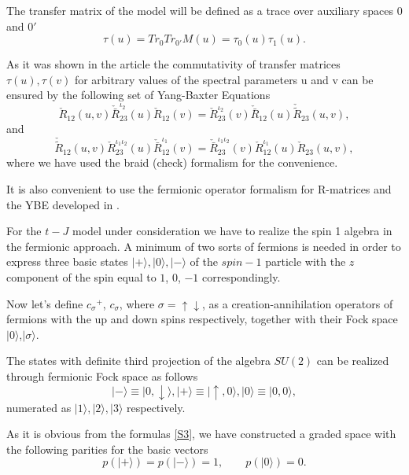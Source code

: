 \documentclass[a4paper,12pt]{article}
\begin{document}
The transfer matrix of the model will be defined as a trace over auxiliary 
spaces $0$ and $0'$ 
\begin{equation} 
\label{T1}
\tau(u)=Tr_0Tr_{0'}M(u)=\tau_0(u)\tau_1(u).
\end{equation}

As it was shown in the article \cite{APSS} the commutativity of 
transfer matrices $\tau(u),\tau(v)$ for arbitrary values of the
spectral parameters u and v can be ensured by the following set of 
Yang-Baxter Equations
\begin{equation}
\label{R3}
\check{R}_{12}(u,v)\check{\bar{R}}_{23}^{\iota_2}(u)\check{R}_{12}(v)=
\check{R}_{23}^{\iota_2}(v)\check{\bar{R}}_{12}(u)\check{\tilde{R}}_{23}(u,v),
\end{equation}
and
\begin{equation}
\label{R4}
\check{\tilde{R}}_{12}(u,v)\check{R}_{23}^{\iota_1\iota_2}(u)
\check{\bar{R}}_{12}^{\iota_1}(v)
=\check{\bar{R}}_{23}^{\iota_1\iota_2}(v)\check{R}_{12}^{\iota_1}(u)
\check{R}_{23}(u,v),
\end{equation}
where we have used the braid (check) formalism for the convenience.

It is also convenient to use the fermionic operator formalism for 
R-matrices and the YBE developed in \cite{HS, AK, GM, US}.

For the $t-J$ model under consideration \cite{AK,U,L,S,KOR,BBO,EK} we 
have to
realize the spin 1 algebra in the fermionic approach. A minimum of two
sorts of fermions is needed in order to express three basic states 
$\mid+\rangle,\mid 0 \rangle,\mid -\rangle$ of the $spin-1$
particle with the $z$ component of the spin equal to $1$, $0$, $-1$ 
correspondingly.

Now let's define ${c_\sigma}^+$, $c_\sigma$, where $\sigma=\uparrow
\downarrow$, as a creation-annihilation operators of fermions with the
 up and down spins respectively, together with their Fock space 
$\mid0\rangle$,$ \mid{\sigma}\rangle$.

The states with definite third projection of the algebra $SU(2)$
can be realized through fermionic Fock space as follows
\begin{equation}
\label{S3}
\mid-\rangle \equiv \mid0 ,\downarrow \rangle, 
\mid+\rangle \equiv \mid \uparrow ,0 \rangle,
\mid0\rangle \equiv \mid0 ,0\rangle,
\end{equation}
numerated as $\mid 1 \rangle,\mid 2 \rangle,\mid 3 \rangle$ respectively.

As it is obvious from the formulas \ref{S3}, we have constructed a
graded space with the following parities for the basic vectors
\begin{equation}
\label{S4}
p(\mid+\rangle)=p(\mid -\rangle)=1, \qquad p(\mid 0\rangle)=0.
\end{equation}
\end{document}
